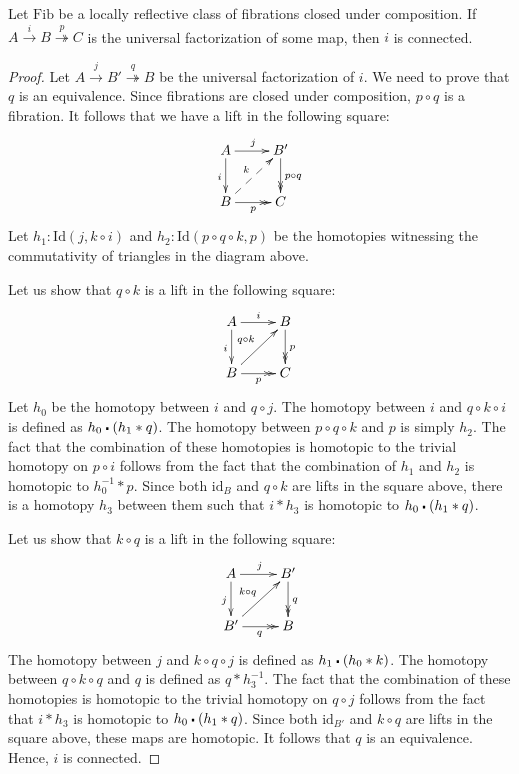 \documentclass[reqno]{mscs}
\newcommand{\fs}[1]{\mathrm{#1}}
\newcommand{\Id}{\fs{Id}}
\newcommand{\sym}[1]{#1^{-1}}
\newcommand{\id}{\fs{id}}
\newcommand{\Fib}{\fs{Fib}}
\numberwithin{figure}{section}
\newcommand{\ct}{%
  \mathchoice{\mathbin{\raisebox{0.25ex}{$\displaystyle\centerdot$}}}%
             {\mathbin{\raisebox{0.25ex}{$\centerdot$}}}%
             {\mathbin{\raisebox{0.25ex}{$\scriptstyle\,\centerdot\,$}}}%
             {\mathbin{\raisebox{0.25ex}{$\scriptscriptstyle\,\centerdot\,$}}}
}
\begin{document}
\begin{lem}
Let $\Fib$ be a locally reflective class of fibrations closed under composition.
If $A \xrightarrow{i} B \overset{p}\twoheadrightarrow C$ is the universal factorization of some map, then $i$ is connected.
\end{lem}
\begin{proof}
Let $A \xrightarrow{j} B' \overset{q}\twoheadrightarrow B$ be the universal factorization of $i$.
We need to prove that $q$ is an equivalence.
Since fibrations are closed under composition, $p \circ q$ is a fibration.
It follows that we have a lift in the following square:
\[ \xymatrix{ A \ar[r]^j \ar[d]_i               & B' \ar@{->>}[d]^{p \circ q} \\
              B \ar@{->>}[r]_p \ar@{-->}[ur]^k  & C
            } \]
Let $h_1 : \Id(j, k \circ i)$ and $h_2 : \Id(p \circ q \circ k, p)$ be the homotopies witnessing the commutativity of triangles in the diagram above.

Let us show that $q \circ k$ is a lift in the following square:
\[ \xymatrix{ A \ar[r]^i \ar[d]_i                   & B \ar@{->>}[d]^p \\
              B \ar@{->>}[r]_p \ar[ur]^{q \circ k}  & C
            } \]
Let $h_0$ be the homotopy between $i$ and $q \circ j$.
The homotopy between $i$ and $q \circ k \circ i$ is defined as $h_0 \ct (h_1 * q)$.
The homotopy between $p \circ q \circ k$ and $p$ is simply $h_2$.
The fact that the combination of these homotopies is homotopic to the trivial homotopy on $p \circ i$ follows from the fact that the combination of $h_1$ and $h_2$ is homotopic to $\sym{h_0} * p$.
Since both $\id_B$ and $q \circ k$ are lifts in the square above, there is a homotopy $h_3$ between them such that $i * h_3$ is homotopic to $h_0 \ct (h_1 * q)$.

Let us show that $k \circ q$ is a lift in the following square:
\[ \xymatrix{ A \ar[r]^j \ar[d]_j                   & B' \ar@{->>}[d]^q \\
              B' \ar@{->>}[r]_q \ar[ur]^{k \circ q} & B
            } \]
The homotopy between $j$ and $k \circ q \circ j$ is defined as $h_1 \ct (h_0 * k)$.
The homotopy between $q \circ k \circ q$ and $q$ is defined as $q * \sym{h_3}$.
The fact that the combination of these homotopies is homotopic to the trivial homotopy on $q \circ j$ follows from the fact that $i * h_3$ is homotopic to $h_0 \ct (h_1 * q)$.
Since both $\id_{B'}$ and $k \circ q$ are lifts in the square above, these maps are homotopic.
It follows that $q$ is an equivalence.
Hence, $i$ is connected.
\end{proof}
\end{document}
